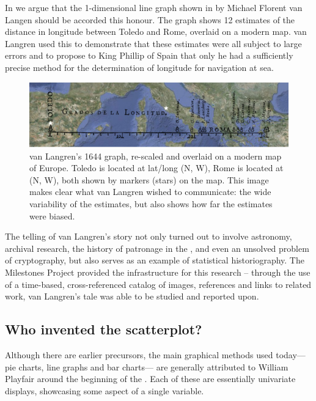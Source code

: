 In \citet{Friendly-etal:2010:langren} we argue that the 1-dimensional line graph shown in  by Michael Florent van Langen \citep{Langren:1644} should be accorded this honour. The graph shows 12 estimates of the distance in longitude between Toledo and Rome, overlaid on a modern map. van Langren used this to demonstrate that these estimates were all subject to large errors and to
propose to King Phillip of Spain that only he had a sufficiently precise method for the determination of longitude for navigation at sea.

\begin{figure}[htb]
 \centering
 \includegraphics[width=\textwidth]{fig/langren-google-overlay2}
 \caption{van Langren's 1644 graph, re-scaled and overlaid on a modern map of Europe. Toledo is located at lat/long %
(N, W), Rome is located at (N, W), both shown by markers (stars) on the map.  This image makes clear what van Langren wished to communicate: the wide variability of the estimates, but also shows how far the estimates were biased.}%
\label{fig:langren-google-overlay}
\end{figure}

The telling of van Langren's story not only turned out to involve astronomy, archival research, the history of patronage in the , and even an unsolved problem of cryptography, but also serves as an example of statistical historiography.  The Milestones Project provided the infrastructure for this research -- through the use of a time-based, cross-referenced catalog of images, references and links to related work, van Langren's tale was able to be studied and reported upon.

\subsection{Who invented the scatterplot?}
Although there are earlier precursors, the main graphical methods used today---
pie charts, line graphs and bar charts--- are generally attributed to William Playfair around the beginning of the  \citep{Playfair:1786,Playfair:1801}. Each of these are essentially univariate displays, showcasing some aspect of a single variable. 

